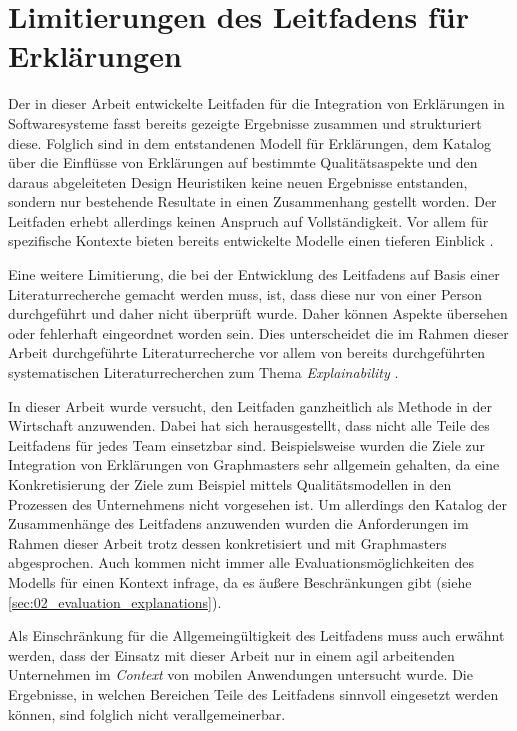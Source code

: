 \section{Limitierungen des Leitfadens für Erklärungen}

Der in dieser Arbeit entwickelte Leitfaden für die Integration von Erklärungen in Softwaresysteme fasst bereits gezeigte Ergebnisse zusammen und strukturiert diese. Folglich sind in dem entstandenen Modell für Erklärungen, dem Katalog über die Einflüsse von Erklärungen auf bestimmte Qualitätsaspekte und den daraus abgeleiteten Design Heuristiken keine neuen Ergebnisse entstanden, sondern nur bestehende Resultate in einen Zusammenhang gestellt worden. 
Der Leitfaden erhebt allerdings keinen Anspruch auf Vollständigkeit. Vor allem für spezifische Kontexte bieten bereits entwickelte Modelle einen tieferen Einblick \cite{nunes_systematic_2017, sokol_explainability_2020}.

Eine weitere Limitierung, die bei der Entwicklung des Leitfadens auf Basis einer Literaturrecherche gemacht werden muss, ist, dass diese nur von einer Person durchgeführt und daher nicht überprüft wurde. Daher können Aspekte übersehen oder fehlerhaft eingeordnet worden sein. Dies unterscheidet die im Rahmen dieser Arbeit durchgeführte Literaturrecherche vor allem von bereits durchgeführten systematischen Literaturrecherchen zum Thema \textit{Explainability} \cite[vgl.][]{nunes_systematic_2017,chazette_knowledge_nodate}.

In dieser Arbeit wurde versucht, den Leitfaden ganzheitlich als Methode in der Wirtschaft anzuwenden. Dabei hat sich herausgestellt, dass nicht alle Teile des Leitfadens für jedes Team einsetzbar sind. Beispielsweise wurden die Ziele zur Integration von Erklärungen von Graphmasters sehr allgemein gehalten, da eine Konkretisierung der Ziele zum Beispiel mittels Qualitätsmodellen \cite{schneider2012abenteuer} in den Prozessen des Unternehmens nicht vorgesehen ist. Um allerdings den Katalog der Zusammenhänge des Leitfadens anzuwenden wurden die Anforderungen im Rahmen dieser Arbeit trotz dessen konkretisiert und mit Graphmasters abgesprochen. Auch kommen nicht immer alle Evaluationsmöglichkeiten des Modells für einen Kontext infrage, da es äußere Beschränkungen gibt (siehe \autoref{sec:02_evaluation_explanations}).

Als Einschränkung für die Allgemeingültigkeit des Leitfadens muss auch erwähnt werden, dass der Einsatz mit dieser Arbeit nur in einem agil arbeitenden Unternehmen im \textit{Context} von mobilen Anwendungen untersucht wurde. Die Ergebnisse, in welchen Bereichen Teile des Leitfadens sinnvoll eingesetzt werden können, sind folglich nicht verallgemeinerbar.

